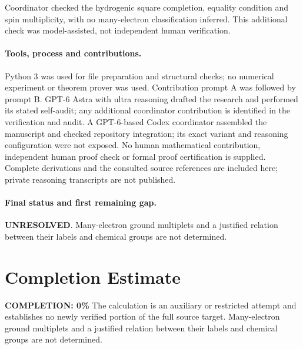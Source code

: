\documentclass[11pt]{article}
\begin{document}
Coordinator checked the hydrogenic square completion, equality condition and spin multiplicity, with no many-electron classification inferred. This additional check was model-assisted, not independent human verification.

\paragraph{Tools, process and contributions.}
Python 3 was used for file preparation and structural checks; no numerical experiment or theorem prover was used. Contribution prompt A was followed by prompt B. GPT-6 Astra with ultra reasoning drafted the research and performed its stated self-audit; any additional coordinator contribution is identified in the verification and audit. A GPT-6-based Codex coordinator assembled the manuscript and checked repository integration; its exact variant and reasoning configuration were not exposed. No human mathematical contribution, independent human proof check or formal proof certification is supplied. Complete derivations and the consulted source references are included here; private reasoning transcripts are not published.

\paragraph{Final status and first remaining gap.}
\textbf{UNRESOLVED}. Many-electron ground multiplets and a justified relation between their labels and chemical groups are not determined.

\section{Completion Estimate}
\noindent\textbf{COMPLETION: 0\%}
The calculation is an auxiliary or restricted attempt and establishes no newly verified portion of the full source target. Many-electron ground multiplets and a justified relation between their labels and chemical groups are not determined.
\end{document}
